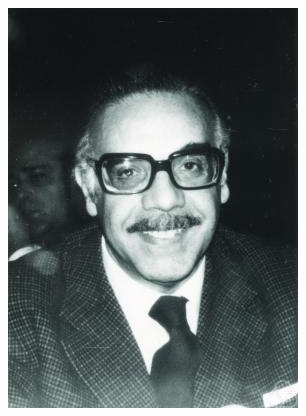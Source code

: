 \documentclass[aspectratio=169,xcolor=dvipsnames,11pt]{beamer}
\begin{document}
\begin{frame}
\begin{minipage}{0.3\linewidth}
\begin{figure}
\begin{minipage}[b]{0.46\textwidth}
    \includegraphics[width=\linewidth]{figures/Gaetano_Fichera.jpg}
  \end{minipage}
\end{figure}\vspace{-8ex}
\begin{figure}
	\centering
\end{figure}
\end{minipage}
\end{frame}
\end{document}
